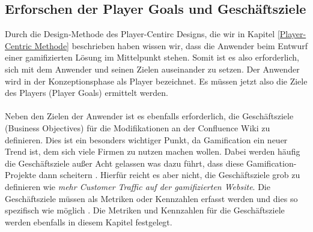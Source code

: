 \documentclass[a4paper,12pt]{scrartcl}
\begin{document}
\subsection{Erforschen der Player Goals und Geschäftsziele}
Durch die Design-Methode des Player-Centirc Designs, die wir in Kapitel \ref{Player-Centric Methode} beschrieben haben wissen wir, dass die Anwender beim Entwurf einer gamifizierten Lösung im Mittelpunkt stehen. Somit ist es also erforderlich, sich mit dem Anwender und seinen Zielen auseinander zu setzen. Der Anwender wird in der  Konzeptionsphase als Player bezeichnet. Es müssen jetzt also die Ziele des Players (Player Goals) ermittelt werden. 
\\\\
Neben den Zielen der Anwender ist es ebenfalls erforderlich, die Geschäftsziele (Business Objectives) für die Modifikationen an der Confluence Wiki zu definieren. Dies ist ein besonders wichtiger Punkt, da Gamification ein neuer Trend ist, dem sich viele Firmen zu nutzen machen wollen. Dabei werden häufig die Geschäftsziele außer Acht gelassen was dazu führt, dass diese Gamification-Projekte dann scheitern \cite{gamificationDefinition}. Hierfür reicht es aber nicht, die Geschäftsziele grob zu definieren wie \textit{mehr Customer Traffic auf der gamifizierten Website}. Die Geschäftsziele müssen als Metriken oder Kennzahlen erfasst werden und dies so spezifisch wie möglich \cite{gamificationDefinition}. Die Metriken und Kennzahlen für die Geschäftsziele werden ebenfalls in diesem Kapitel festgelegt.
\end{document}
